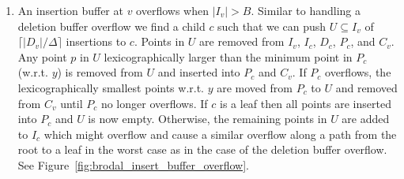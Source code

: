 \documentclass[twoside,11pt,openright]{report}
\begin{document}
\begin{enumerate}[label=(\roman*)]
	\item\label{update:ins} An insertion buffer at $v$ overflows when $\vert I_v \vert > B$. Similar to handling a deletion buffer overflow we find a child $c$ such that we can push $U \subseteq I_v$ of $\lceil \vert D_v \vert / \Delta \rceil$ insertions to $c$. Points in $U$ are removed from $I_v$, $I_c$, $D_c$, $P_c$, and $C_v$.
	Any point $p$ in $U$ lexicographically larger than the minimum point in $P_c$ (w.r.t. $y$) is removed from $U$ and inserted into $P_c$ and $C_v$.
	If $P_c$ overflows, the lexicographically smallest points w.r.t. $y$ are moved from $P_c$ to $U$ and removed from $C_v$ until $P_c$ no longer overflows.
	If $c$ is a leaf then all points are inserted into $P_c$ and $U$ is now empty.
	Otherwise, the remaining points in $U$ are added to $I_c$ which might overflow and cause a similar overflow along a path from the root to a leaf in the worst case as in the case of the deletion buffer overflow. See Figure~\ref{fig:brodal_insert_buffer_overflow}.
	

\end{enumerate}
\end{document}
